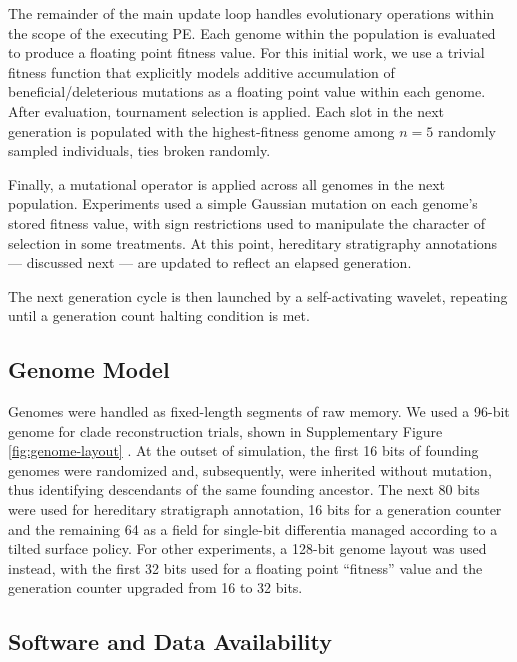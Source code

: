 The remainder of the main update loop handles evolutionary operations within the scope of the executing PE.
Each genome within the population is evaluated to produce a floating point fitness value.
For this initial work, we use a trivial fitness function that explicitly models additive accumulation of beneficial/deleterious mutations as a floating point value within each genome.
After evaluation, tournament selection is applied.
Each slot in the next generation is populated with the highest-fitness genome among $n=5$ randomly sampled individuals, ties broken randomly.

Finally, a mutational operator is applied across all genomes in the next population.
Experiments used a simple Gaussian mutation on each genome's stored fitness value, with sign restrictions used to manipulate the character of selection in some treatments.
At this point, hereditary stratigraphy annotations --- discussed next --- are updated to reflect an elapsed generation.

The next generation cycle is then launched by a self-activating wavelet, repeating until a generation count halting condition is met.

\subsection{Genome Model}

Genomes were handled as fixed-length segments of raw memory.
We used a 96-bit genome for clade reconstruction trials, shown in Supplementary Figure \ref{fig:genome-layout} \citep{moreno2024supplement}.
At the outset of simulation, the first 16 bits of founding genomes were randomized and, subsequently, were inherited without mutation, thus identifying descendants of the same founding ancestor.
The next 80 bits were used for hereditary stratigraph annotation, 16 bits for a generation counter and the remaining 64 as a field for single-bit differentia managed according to a tilted surface policy.
For other experiments, a 128-bit genome layout was used instead, with the first 32 bits used for a floating point ``fitness'' value and the generation counter upgraded from 16 to 32 bits.

\subsection{Software and Data Availability}

